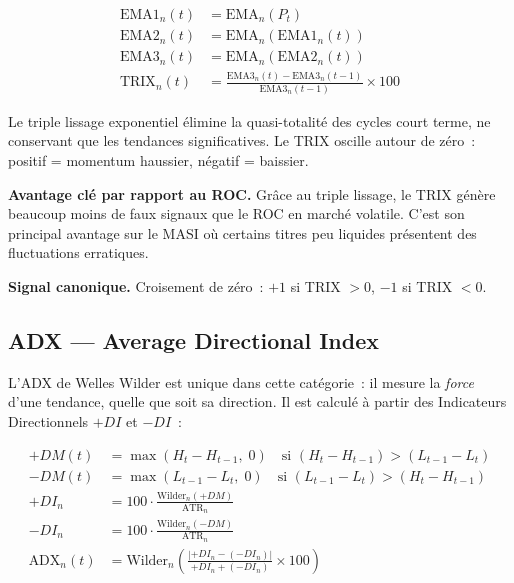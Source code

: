 \begin{align}
    \text{EMA1}_n(t) &= \text{EMA}_n(P_t) \label{eq:trix1} \\
    \text{EMA2}_n(t) &= \text{EMA}_n(\text{EMA1}_n(t)) \label{eq:trix2} \\
    \text{EMA3}_n(t) &= \text{EMA}_n(\text{EMA2}_n(t)) \label{eq:trix3} \\
    \text{TRIX}_n(t) &= \frac{\text{EMA3}_n(t) - \text{EMA3}_n(t-1)}{\text{EMA3}_n(t-1)} \times 100
    \label{eq:trix}
\end{align}

Le triple lissage exponentiel élimine la quasi-totalité des cycles court terme, ne
conservant que les tendances significatives. Le TRIX oscille autour de zéro~:
positif = momentum haussier, négatif = baissier.

\textbf{Avantage clé par rapport au ROC.}
Grâce au triple lissage, le TRIX génère beaucoup moins de faux signaux que le ROC
en marché volatile. C'est son principal avantage sur le MASI où certains titres peu
liquides présentent des fluctuations erratiques.

\textbf{Signal canonique.} Croisement de zéro~: $+1$ si TRIX $> 0$, $-1$ si TRIX $< 0$.

\subsection{ADX — Average Directional Index}

L'ADX de Welles Wilder est unique dans cette catégorie~: il mesure la \textit{force}
d'une tendance, quelle que soit sa direction. Il est calculé à partir des Indicateurs
Directionnels $+DI$ et $-DI$~:

\begin{align}
    +DM(t) &= \max(H_t - H_{t-1},\; 0) \quad \text{si } (H_t - H_{t-1}) > (L_{t-1} - L_t) \label{eq:plus_dm} \\
    -DM(t) &= \max(L_{t-1} - L_t,\; 0) \quad \text{si } (L_{t-1} - L_t) > (H_t - H_{t-1}) \label{eq:minus_dm} \\
    +DI_n  &= 100 \cdot \frac{\text{Wilder}_n(+DM)}{\text{ATR}_n} \label{eq:plus_di} \\
    -DI_n  &= 100 \cdot \frac{\text{Wilder}_n(-DM)}{\text{ATR}_n} \label{eq:minus_di} \\
    \text{ADX}_n(t) &= \text{Wilder}_n\!\left(\frac{|+DI_n - (-DI_n)|}{+DI_n + (-DI_n)} \times 100\right)
    \label{eq:adx}
\end{align}

